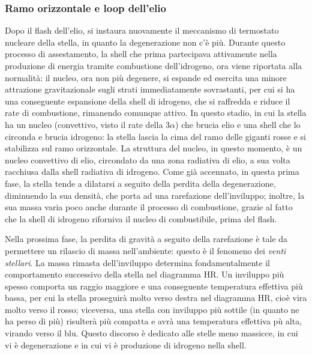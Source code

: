 \documentclass[11pt, a4paper]{scrartcl}
\theoremstyle{style}
\theoremstyle{style1}
\numberwithin{equation}{subsection}
\begin{document}
\subsubsection{Ramo orizzontale e loop dell'elio}

Dopo il flash dell'elio, si instaura nuovamente il meccanismo di termostato nucleare della stella, in quanto la degenerazione non c'\`e pi\`u.
Durante questo processo di assestamento, la shell che prima partecipava attivamente nella produzione di energia tramite combustione dell'idrogeno, ora viene riportata alla normalit\`a: il nucleo, ora non pi\`u degenere, si espande ed esercita una minore attrazione gravitazionale sugli strati immediatamente sovrastanti, per cui si ha una conseguente espansione della shell di idrogeno, che si raffredda e riduce il rate di combustione, rimanendo comunque attivo.
In questo stadio, in cui la stella ha un nucleo (convettivo, visto il rate della $3\alpha $) che brucia elio e una shell che lo circonda e brucia idrogeno: la stella lascia la cima del ramo delle giganti rosse e si stabilizza sul ramo orizzontale.
La struttura del nucleo, in questo momento, \`e un nucleo convettivo di elio, circondato da una zona radiativa di elio, a sua volta racchiusa dalla shell radiativa di idrogeno.
Come gi\`a accennato, in questa prima fase, la stella tende a dilatarsi a seguito della perdita della degenerazione, diminuendo la sua densit\`a, che porta ad una rarefazione dell'inviluppo; inoltre, la sua massa varia poco anche durante il processo di combustione, grazie al fatto che la shell di idrogeno riforniva il nucleo di combustibile, prima del flash.

Nella prossima fase, la perdita di gravit\`a a seguito della rarefazione \`e tale da permettere un rilascio di massa nell'ambiente: questo \`e il fenomeno dei \textit{venti stellari}.
La massa rimasta dell'inviluppo determina fondamentalmente il comportamento successivo della stella nel diagramma HR.
Un inviluppo pi\`u spesso comporta un raggio maggiore e una conseguente temperatura effettiva pi\`u bassa, per cui la stella proseguir\`a molto verso destra nel diagramma HR, cio\`e vira molto verso il rosso; viceversa, una stella con inviluppo pi\`u sottile (in quanto ne ha perso di pi\`u) risulter\`a pi\`u compatta e avr\`a una temperatura effettiva p\`u alta, virando verso il blu.
Questo discorso \`e dedicato alle stelle meno massicce, in cui vi \`e degenerazione e in cui vi \`e produzione di idrogeno nella shell.
\end{document}
